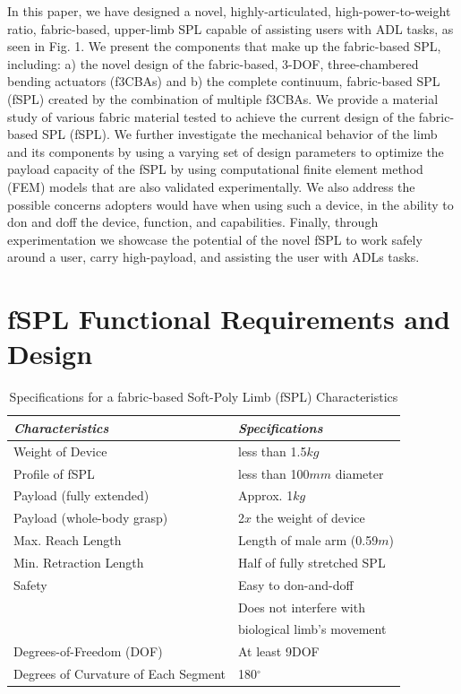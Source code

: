 \documentclass[letterpaper, 10 pt, conference]{ieeeconf}  %
\begin{document}
In this paper, we have designed a novel, highly-articulated, high-power-to-weight ratio, fabric-based, upper-limb SPL capable of assisting users with ADL tasks, as seen in Fig. 1. We present the components that make up the fabric-based SPL, including: a) the novel design of the fabric-based, 3-DOF, three-chambered bending actuators (f3CBAs) and b) the complete continuum, fabric-based SPL (fSPL) created by the combination of multiple f3CBAs. We provide a material study of various fabric material tested to achieve the current design of the fabric-based SPL (fSPL). We further investigate the mechanical behavior of the limb and its components by using a varying set of design parameters to optimize the payload capacity of the fSPL by using computational finite element method (FEM) models that are also validated experimentally. We also address the possible concerns adopters would have when using such a device, in the ability to don and doff the device, function, and capabilities. Finally, through experimentation we showcase the potential of the novel fSPL to work safely around a user, carry high-payload, and assisting the user with ADLs tasks. 


\section{fSPL Functional Requirements and Design}

\begin{table}[t!]
\caption{Specifications for a fabric-based Soft-Poly Limb (fSPL) Characteristics} 
\label{tab:spec_table}
	\begin{tabularx}{0.48\textwidth}{*2l}    \toprule\toprule
	\textbf{\emph{Characteristics}} & \textbf{\emph{Specifications}} \\\midrule
	Weight of Device    & less than 1.5$kg$  \\ 
	Profile of fSPL & less than 100$mm$ diameter \\ 
	Payload (fully extended)    & Approx. 1$kg$  \\ 
	Payload (whole-body grasp) & 2$x$ the weight of device \\ 
	Max. Reach Length    & Length of male arm (0.59$m$)  \\ 
	Min. Retraction Length & Half of fully stretched SPL \\ 
	Safety    & Easy to don-and-doff \\ 
	 &Does not interfere with\\
     &biological limb's movement\\
	Degrees-of-Freedom (DOF) & At least 9DOF \\ 
	Degrees of Curvature of Each Segment & 180$^{\circ}$ \\\bottomrule
	 \hline
	\end{tabularx}
\end{table}
\end{document}
